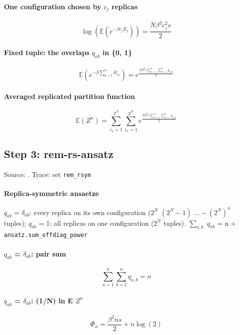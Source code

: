 \documentclass[11pt]{article}
\begin{document}
\paragraph{One configuration chosen by $c_{j}$ replicas}
\begin{equation}
\log{\left(\mathbb{E}{\left(e^{- \beta c_{j} {E}_{j}} \right)} \right)} = \frac{N \beta^{2} c_{j}^{2} s}{2}
\end{equation}
\paragraph{Fixed tuple: the overlaps $q_{ab}$ in \{0, 1\}}
\begin{equation}
\mathbb{E}{\left(e^{- \beta \sum_{a=1}^{n} {E}_{{i}_{a}}} \right)} = e^{\frac{N \beta^{2} s \sum_{a=1}^{n} \sum_{b=1}^{n} {q}_{a,b}}{2}}
\end{equation}
\paragraph{Averaged replicated partition function}
\begin{equation}
\mathbb{E}{\left(Z^{n} \right)} = \sum_{{i}_{1}=1}^{2^{N}} \sum_{{i}_{n}=1}^{2^{N}} e^{\frac{N \beta^{2} s \sum_{a=1}^{n} \sum_{b=1}^{n} {q}_{a,b}}{2}}
\end{equation}
\subsection{Step 3: rem-rs-ansatz}
Source: \cite{b3,b4}. Trace: set \texttt{rem\_rsym}

\paragraph{Replica-symmetric ansaetze}
$q_{ab}$ = $\delta _{ab}$: every replica on its own configuration ($2^{N}$ $(2^{N} - 1)$ ... \~{} $(2^{N})^{n}$ tuples); $q_{ab}$ = 1: all replicas on one configuration ($2^{N}$ tuples).  $\sum _{a,b}$ $q_{ab}$ = n + \texttt{ansatz.sum\_offdiag\_power}
\paragraph{$q_{ab}$ = $\delta _{ab}$: pair sum}
\begin{equation}
\sum_{a=1}^{n} \sum_{b=1}^{n} {q}_{a,b} = n
\end{equation}
\paragraph{$q_{ab}$ = $\delta _{ab}$: (1/N) ln E $Z^{n}$}
\begin{equation}
\Phi_{n} = \frac{\beta^{2} n s}{2} + n \log{\left(2 \right)}
\end{equation}
\end{document}
